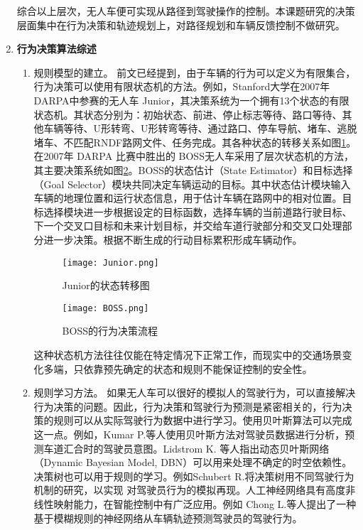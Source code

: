 \begin{enumerate}[wide=\parindent]
\begin{enumerate}[label=(\arabic*), wide=\parindent]
\end{enumerate}

综合以上层次，无人车便可实现从路径到驾驶操作的控制。本课题研究的决策层面集中在行为决策和轨迹规划上，对路径规划和车辆反馈控制不做研究。\\

\item \textbf{行为决策算法综述}
\label{sec:behavior}

\begin{enumerate}[label=(\arabic*),wide=\parindent]
\item 规则模型的建立。
前文已经提到，由于车辆的行为可以定义为有限集合，行为决策可以使用有限状态机的方法。例如，Stanford大学在2007年 DARPA中参赛的无人车 Junior，其决策系统为一个拥有13个状态的有限状态机\cite{Montemerlo2008Junior}。其状态分别为：初始状态、前进、停止标志等待、路口等待、其他车辆等待、U形转弯、U形转弯等待、通过路口、停车导航、堵车、逃脱堵车、不匹配RNDF路网文件、任务完成。其各种状态的转移关系如图\ref{fig:junior}。在2007年 DARPA 比赛中胜出的 BOSS\cite{Baker2008Traffic}无人车采用了层次状态机的方法，其主要决策系统如图\ref{fig:boss}。BOSS的状态估计（State Estimator）和目标选择（Goal Selector）模块共同决定车辆运动的目标。其中状态估计模块输入车辆的地理位置和运行状态信息，用于估计车辆在路网中的相对位置。目标选择模块进一步根据设定的目标函数，选择车辆的当前道路行驶目标、下一个交叉口目标和未来计划目标，并交给车道行驶部分和交叉口处理部分进一步决策。根据不断生成的行动目标累积形成车辆动作。

\begin{figure}[htbp]
\centering
\texttt{[image: Junior.png]}
\caption[Junior的状态转移图]{Junior的状态转移图\cite{Montemerlo2008Junior}}
\label{fig:junior}
\end{figure}

\begin{figure}[htbp]
\centering
\texttt{[image: BOSS.png]}
\caption[BOSS的行为决策流程]{BOSS的行为决策流程\cite{Baker2008Traffic}}
\label{fig:boss}
\end{figure}

这种状态机方法往往仅能在特定情况下正常工作，而现实中的交通场景变化多端，只依靠预先确定的状态和规则不能保证控制的安全性。

\item 规则学习方法。
如果无人车可以很好的模拟人的驾驶行为，可以直接解决行为决策的问题。因此，行为决策和驾驶行为预测是紧密相关的，行为决策的规则可以从实际驾驶行为数据中进行学习。使用贝叶斯算法可以完成这一点。例如，Kumar P.等人\cite{Kumar2013Learning}使用贝叶斯方法对驾驶员数据进行分析，预测车道汇合时的驾驶员意图。Lidstrom K. 等人\cite{Lidstrom2008Model}指出动态贝叶斯网络（Dynamic Bayesian Model, DBN）可以用来处理不确定的时空依赖性。决策树也可以用于规则的学习。例如Schubert R.\cite{Schubert2012Evaluating}将决策树用不同驾驶行为机制的研究，以实现 对驾驶员行为的模拟再现。人工神经网络具有高度非线性映射能力，在智能控制中有广泛应用。例如 Chong L.等人\cite{Chong2013A}提出了一种基于模糊规则的神经网络从车辆轨迹预测驾驶员的驾驶行为。


\end{enumerate}
\end{enumerate}
